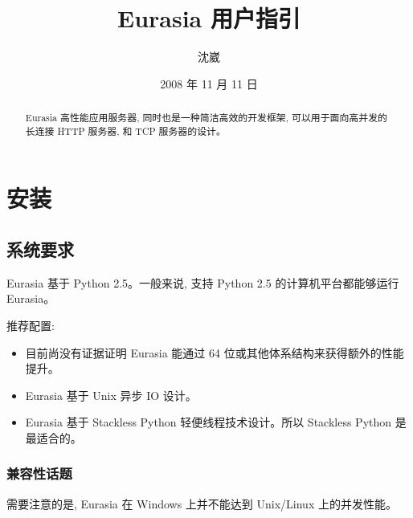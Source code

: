 \documentclass{manual}
\title{Eurasia 用户指引}
\author{沈崴}
\date{2008 年 11 月 11 日}
\begin{document}
\maketitle

\begin{abstract}

\noindent

Eurasia 高性能应用服务器, 同时也是一种简洁高效的开发框架, 可以用于面向高并发的长连接 HTTP 服务器, 和 TCP 服务器的设计。

\end{abstract}

\tableofcontents


\chapter{安装}

\section{系统要求}

Eurasia 基于 Python 2.5。一般来说, 支持 Python 2.5 的计算机平台都能够运行 Eurasia。

推荐配置:

\begin{itemize}

\item {}

目前尚没有证据证明 Eurasia 能通过 64 位或其他体系结构来获得额外的性能提升。

\item {}

Eurasia 基于 Unix 异步 IO 设计。

\item {}

Eurasia 基于 Stackless Python 轻便线程技术设计。所以 Stackless Python 是最适合的。

\end{itemize}

\subsection{兼容性话题}


需要注意的是, Eurasia 在 Windows 上并不能达到 Unix/Linux 上的并发性能。

\end{document}
